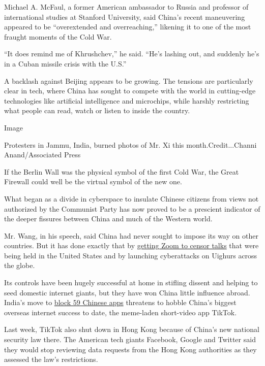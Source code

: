Michael A. McFaul, a former American ambassador to Russia and professor
of international studies at Stanford University, said China's recent
maneuvering appeared to be ``overextended and overreaching,'' likening
it to one of the most fraught moments of the Cold War.

``It does remind me of Khrushchev,'' he said. ``He's lashing out, and
suddenly he's in a Cuban missile crisis with the U.S.''

A backlash against Beijing appears to be growing. The tensions are
particularly clear in tech, where China has sought to compete with the
world in cutting-edge technologies like artificial intelligence and
microchips, while harshly restricting what people can read, watch or
listen to inside the country.

Image

Protesters in Jammu, India, burned photos of Mr. Xi this
month.Credit...Channi Anand/Associated Press

If the Berlin Wall was the physical symbol of the first Cold War, the
Great Firewall could well be the virtual symbol of the new one.

What began as a divide in cyberspace to insulate Chinese citizens from
views not authorized by the Communist Party has now proved to be a
prescient indicator of the deeper fissures between China and much of the
Western world.

Mr. Wang, in his speech, said China had never sought to impose its way
on other countries. But it has done exactly that by
\href{https://www.nytimes3xbfgragh.onion/2020/06/11/technology/zoom-china-tiananmen-square.html}{getting
Zoom to censor talks} that were being held in the United States and by
launching cyberattacks on Uighurs across the globe.

Its controls have been hugely successful at home in stifling dissent and
helping to seed domestic internet giants, but they have won China little
influence abroad. India's move to
\href{https://www.nytimes3xbfgragh.onion/2020/06/29/world/asia/tik-tok-banned-india-china.html?searchResultPosition=1}{block
59 Chinese apps} threatens to hobble China's biggest overseas internet
success to date, the meme-laden short-video app TikTok.

Last week, TikTok also shut down in Hong Kong because of China's new
national security law there. The American tech giants Facebook, Google
and Twitter said they would stop reviewing data requests from the Hong
Kong authorities as they assessed the law's restrictions.

